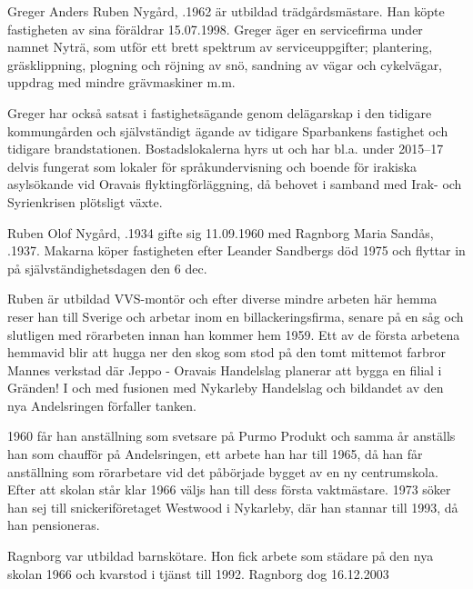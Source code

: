 {{{{%
%



%
Greger Anders Ruben Nygård, .1962 är utbildad trädgårdsmästare. Han köpte fastigheten av sina föräldrar 15.07.1998. Greger äger en servicefirma under namnet Nyträ, som utför ett brett spektrum av serviceuppgifter; plantering, gräsklippning, plogning och röjning av snö, sandning av vägar och cykelvägar, uppdrag med mindre grävmaskiner m.m.

Greger har också satsat i fastighetsägande genom delägarskap i den tidigare kommungården och självständigt ägande av tidigare Sparbankens fastighet och tidigare brandstationen. Bostadslokalerna hyrs ut och har bl.a. under 2015--17 delvis fungerat som lokaler för språkundervisning och boende för irakiska asylsökande vid Oravais flyktingförläggning, då behovet i samband med Irak- och Syrienkrisen plötsligt växte.


%
Ruben Olof Nygård, .1934 gifte sig 11.09.1960 med Ragnborg Maria Sandås, .1937. Makarna köper fastigheten efter Leander Sandbergs död 1975 och flyttar in på självständighetsdagen den 6 dec.

Ruben är utbildad VVS-montör och efter diverse mindre arbeten här hemma reser han till Sverige och arbetar inom en billackeringsfirma, senare på en såg och slutligen med rörarbeten innan han kommer hem 1959. Ett av de första arbetena hemmavid blir att hugga ner den skog som stod på den tomt mittemot farbror Mannes verkstad där Jeppo - Oravais Handelslag planerar att bygga en filial i Gränden! I och med fusionen med Nykarleby Handelslag och bildandet av den nya Andelsringen förfaller tanken.

1960 får han anställning som svetsare på Purmo Produkt och samma år anställs han som chaufför på Andelsringen, ett arbete han har till 1965, då han får anställning som rörarbetare vid det påbörjade bygget av en ny centrumskola. Efter att skolan står klar 1966 väljs han till dess första vaktmästare. 1973 söker han sej till snickeriföretaget Westwood i Nykarleby, där han stannar till 1993, då han pensioneras.

Ragnborg var utbildad barnskötare. Hon fick arbete som städare på den nya skolan 1966 och kvarstod i tjänst till 1992. Ragnborg dog 16.12.2003
\begin{jhchildren}
  \item {}
  \item {}
  \item {}
\end{jhchildren}


}}}}
